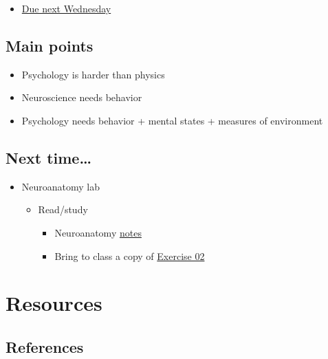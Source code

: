 \documentclass[
  letterpaper,
  DIV=11,
  numbers=noendperiod]{scrartcl}
\providecommand{\tightlist}{%
  \setlength{\itemsep}{0pt}\setlength{\parskip}{0pt}}\usepackage{longtable,booktabs,array}
\begin{document}
\begin{itemize}
\tightlist
\item
  {\href{../exercises/ex01.qmd}{Due next Wednesday}}
\end{itemize}

\subsection{Main points}\label{main-points}

\begin{itemize}
\tightlist
\item
  Psychology is harder than physics
\item
  Neuroscience needs behavior
\item
  Psychology needs behavior + mental states + measures of environment
\end{itemize}

\subsection{Next time\ldots{}}\label{next-time}

\begin{itemize}
\tightlist
\item
  Neuroanatomy lab

  \begin{itemize}
  \tightlist
  \item
    Read/study

    \begin{itemize}
    \tightlist
    \item
      Neuroanatomy \href{../resources/anatomy.qmd}{notes}
    \item
      Bring to class a copy of \href{exercises/ex02.pdf}{Exercise 02}
    \end{itemize}
  \end{itemize}
\end{itemize}

\section{Resources}\label{resources}

\subsection*{References}\label{references}
\end{document}
